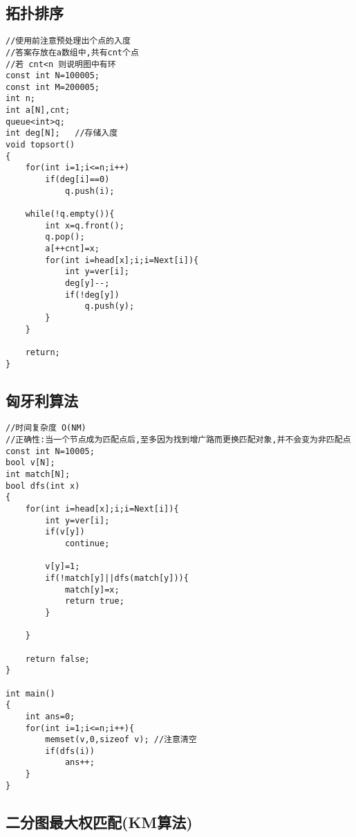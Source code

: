 \documentclass[twocolumn,a4]{article}
\begin{document}
\subsection{拓扑排序}
\begin{lstlisting}
//使用前注意预处理出个点的入度
//答案存放在a数组中,共有cnt个点
//若 cnt<n 则说明图中有环
const int N=100005;
const int M=200005;
int n;
int a[N],cnt;
queue<int>q;
int deg[N];   //存储入度
void topsort()
{
    for(int i=1;i<=n;i++)
        if(deg[i]==0)
            q.push(i);
            
    while(!q.empty()){
        int x=q.front();
        q.pop();
        a[++cnt]=x;
        for(int i=head[x];i;i=Next[i]){
            int y=ver[i];
            deg[y]--;
            if(!deg[y])
                q.push(y);
        }
    }
    
    return;
}
\end{lstlisting}

\subsection{匈牙利算法}
\begin{lstlisting}
//时间复杂度 O(NM)
//正确性:当一个节点成为匹配点后,至多因为找到增广路而更换匹配对象,并不会变为非匹配点
const int N=10005;
bool v[N];
int match[N];
bool dfs(int x)
{
    for(int i=head[x];i;i=Next[i]){
        int y=ver[i];
        if(v[y])
            continue;
            
        v[y]=1;
        if(!match[y]||dfs(match[y])){
            match[y]=x;
            return true;
        }
        
    }
    
    return false;
}

int main()
{
    int ans=0;
    for(int i=1;i<=n;i++){
        memset(v,0,sizeof v); //注意清空
        if(dfs(i))
            ans++;
    }
}
\end{lstlisting}

\subsection{二分图最大权匹配(KM算法)}
\begin{lstlisting}

\end{lstlisting}
\end{document}
